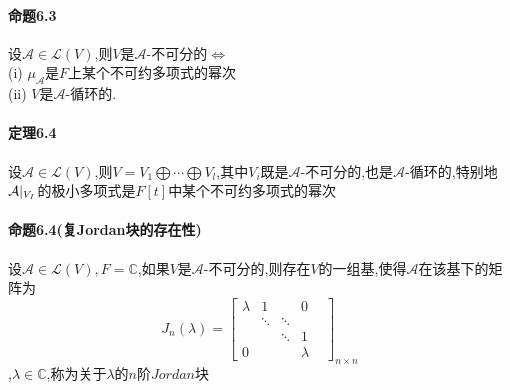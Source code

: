 \documentclass{ctexart}
\begin{document}
\paragraph{命题6.3}
设$\mathcal{A} \in \mathcal{L}(V)$,则$V$是$\mathcal{A}$-不可分的$\Leftrightarrow$\\
(i) $\mu_{\mathcal{A}}$是$F$上某个不可约多项式的幂次\\
(ii) $V$是$\mathcal{A}$-循环的.

\paragraph{定理6.4}
设$\mathcal{A} \in \mathcal{L}(V)$,则$V=V_{1}\bigoplus \cdots \bigoplus V_{l}$,其中$V_{i}$既是$\mathcal{A}$-不可分的,也是$\mathcal{A}$-循环的,特别地$\mathcal{A} \arrowvert_{V_{I}}$的极小多项式是$F[t]$中某个不可约多项式的幂次

\paragraph{命题6.4(复Jordan块的存在性)}
设$\mathcal{A} \in \mathcal{L}(V),F=\mathbb{C}$,如果$V$是$\mathcal{A}$-不可分的,则存在$V$的一组基,使得$\mathcal{A}$在该基下的矩阵为
$$
 J_{n}(\lambda)=
 \left[
 \begin{matrix}
  \lambda & 1 &   & 0 \\
    & \ddots & \ddots &  \\
     &   & \ddots & 1 &  \\
  0 &   &    & \lambda 
  \end{matrix}
  \right]_{n\times n}
$$,$\lambda \in \mathbb{C}$,称为关于$\lambda$的$n$阶$Jordan$块
\end{document}
